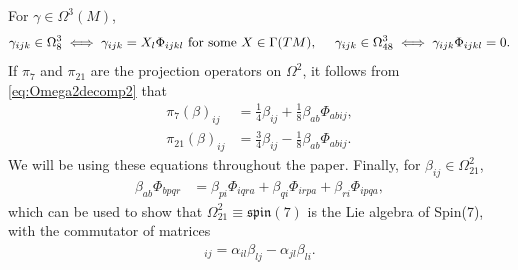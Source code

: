 \documentclass[10pt,a4paper,reqno]{article}
\theoremstyle{definition}
\numberwithin{equation}{section}
\def\s7{\Phi}
\begin{document}
\noindent
For $\gamma\in \Omega^3(M)$,
\begin{align}\label{eq:Omega3decomp2}
\gamma_{ijk}\in \Omega^3_8 \iff \gamma_{ijk}=X_l\s7_{ijkl}\ \textup{for\ some}\ X\in \Gamma(TM),\ \ \ \ \gamma_{ijk}\in \Omega^3_{48} \iff \gamma_{ijk}\s7_{ijkl}=0. 
\end{align}
If $\pi_7$ and $\pi_{21}$ are the projection operators on $\Omega^2$, it follows from \cref{eq:Omega2decomp2} that 
\begin{align}
\pi_7(\beta)_{ij}&=\frac 14\beta_{ij}+\frac 18\beta_{ab}\s7_{abij}, \label{eq:pi7}\\
\pi_{21}(\beta)_{ij}&=\frac 34\beta_{ij}-\frac 18\beta_{ab}\s7_{abij}. \label{eq:pi21}
\end{align}
We will be using these equations throughout the paper.
Finally, for $\beta_{ij}\in \Omega^2_{21}$,
\begin{align}
    \beta_{ab}\s7_{bpqr}&=\beta_{pi}\s7_{iqra}+\beta_{qi}\s7_{irpa}+\beta_{ri}\s7_{ipqa}, \label{eq:221prop}   
\end{align}
which can be used to show that $\Omega^2_{21}\equiv \mathfrak{spin}(7)$ is the Lie algebra of Spin(7), with the commutator of matrices
\begin{align*}
    [\alpha, \beta]_{ij}=\alpha_{il}\beta_{lj}-\alpha_{jl}\beta_{li}.
\end{align*}

\medskip
\end{document}
